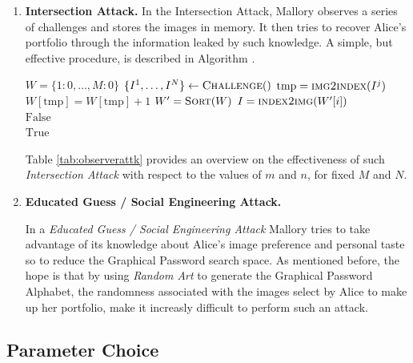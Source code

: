 \documentclass[11pt,a4paper]{article}
\theoremstyle{defn, nobreak=true}
\begin{document}
\begin{enumerate}
	\item \textbf{Intersection Attack.} In the Intersection Attack, Mallory observes a series of challenges and stores the images in memory. It then tries to recover Alice's portfolio through the information leaked by such knowledge. A simple, but effective procedure, is described in Algorithm \cite{alg:obsattk}.

	\begin{algorithm}
	\caption{
	\label{alg:randart}}
	\begin{algorithmic}[1] 

	\State $W = \{1:0, \dots , M:0 \}$
	\State $\{I^1, \dots , I^N\} \gets \textsc{Challenge}()$
	\State $\mathrm{tmp}=\textsc{img2index}(I^j)$
	\State $W[\mathrm{tmp}] = W[\mathrm{tmp}]+1$
	\EndFor
	\EndFor
	\State $W^{\prime}=\textsc{Sort}(W)$
	\State $I=\textsc{index2img}(W^{\prime}[i])$
	 \\
	\quad \quad \quad \Return $\mathrm{False}$
	\EndIf
	\EndFor \\
	\Return $\mathrm{True}$
	\EndProcedure

	\end{algorithmic}
	\end{algorithm}

	Table \ref{tab:observerattk} provides an overview on the effectiveness of such \textit{Intersection Attack} with respect to the values of $m$ and $n$, for fixed $M$ and $N$.

	\item \textbf{Educated Guess / Social Engineering Attack.}

	In a \textit{Educated Guess / Social Engineering Attack} Mallory tries to take advantage of its knowledge about Alice's image preference and personal taste so to reduce the Graphical Password search space. As mentioned before, the hope is that by using \textit{Random Art} to generate the Graphical Password Alphabet, the randomness associated with the images select by Alice to make up her portfolio, make it increasly difficult to perform such an attack.

\end{enumerate}

\subsection{Parameter Choice} \label{subsec:attacks}
\end{document}
